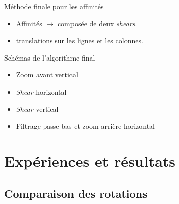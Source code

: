\documentclass[c,12pt]{beamer}
\newcommand{\ra}[0]{\rightarrow}
\begin{document}
\begin{frame}{Méthode finale pour les affinités}
\begin{itemize}
\item Affinités $\ra$ composée de deux \emph{shears}.
\item translations sur les lignes et les colonnes.
\end{itemize}

\begin{block}{Schémas de l'algorithme final}

\begin{itemize}
\item Zoom avant vertical
\item \emph{Shear} horizontal
\item \emph{Shear} vertical
\item Filtrage passe bas et zoom arrière horizontal
\end{itemize}

\end{block}

\end{frame}
    
    
    
     
\section{Expériences et résultats}


\subsection{Comparaison des rotations}
\end{document}
